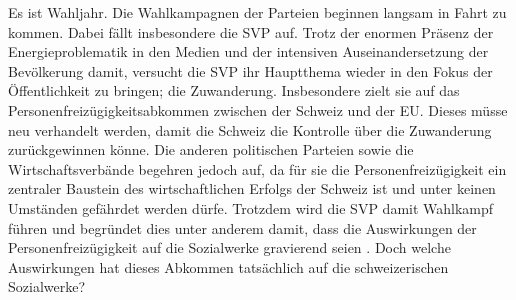 Es ist Wahljahr. Die Wahlkampagnen der Parteien beginnen langsam in Fahrt zu kommen. Dabei fällt insbesondere die SVP auf. Trotz der enormen Präsenz
der Energieproblematik in den Medien und der intensiven Auseinandersetzung der Bevölkerung damit, versucht die SVP  
ihr Hauptthema wieder in den Fokus der Öffentlichkeit zu bringen; die Zuwanderung.
Insbesondere zielt sie auf das Personenfreizügigkeitsabkommen zwischen der Schweiz und der EU. Dieses müsse neu verhandelt werden,
damit die Schweiz die Kontrolle über die Zuwanderung zurückgewinnen könne. Die anderen politischen 
Parteien sowie die Wirtschaftsverbände begehren jedoch auf, da für sie die Personenfreizügigkeit ein zentraler Baustein des
wirtschaftlichen Erfolgs der Schweiz ist und unter keinen Umständen gefährdet werden dürfe.
Trotzdem wird die SVP damit Wahlkampf führen und begründet dies unter anderem damit, dass die Auswirkungen der Personenfreizügigkeit auf die Sozialwerke gravierend seien \cite{SVP:Wahlplattform11}.
Doch welche Auswirkungen hat dieses Abkommen tatsächlich auf die schweizerischen Sozialwerke?
